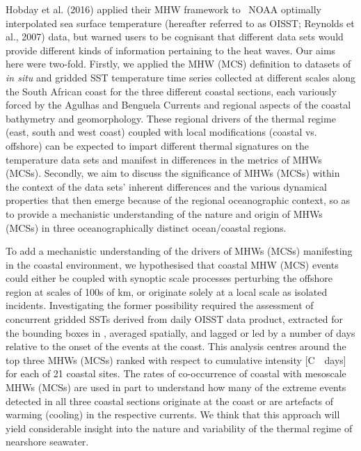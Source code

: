 \documentclass[a4paper,10pt,review]{elsarticle}
\begin{document}
Hobday et al. (2016) applied their MHW framework to \degree~NOAA optimally interpolated sea surface temperature (hereafter referred to as OISST; Reynolds et al., 2007) data, but warned users to be cognisant that different data sets would provide different kinds of information pertaining to the heat waves. Our aims here were two-fold. Firstly, we applied the MHW (MCS) definition to datasets of \emph{in situ} and gridded SST temperature time series collected at different scales along the South African coast for the three different coastal sections, each variously forced by the Agulhas and Benguela Currents and regional aspects of the coastal bathymetry and geomorphology. These regional drivers of the thermal regime (east, south and west coast) coupled with local modifications (coastal vs. offshore) can be expected to impart different thermal signatures on the temperature data sets and manifest in differences in the metrics of MHWs (MCSs). Secondly, we aim to discuss the significance of MHWs (MCSs) within the context of the data sets’ inherent differences and the various dynamical properties that then emerge because of the regional oceanographic context, so as to provide a mechanistic understanding of the nature and origin of MHWs (MCSs) in three oceanographically distinct ocean/coastal regions.

To add a mechanistic understanding of the drivers of MHWs (MCSs) manifesting in the coastal environment, we hypothesised that coastal MHW (MCS) events could either be coupled with synoptic scale processes perturbing the offshore region at scales of 100s of km, or originate solely at a local scale as isolated incidents. Investigating the former possibility required the assessment of concurrent gridded SSTs derived from daily OISST data product, extracted for the bounding boxes in , averaged spatially, and lagged or led by a number of days relative to the onset of the events at the coast. This analysis centres around the top three MHWs (MCSs) ranked with respect to cumulative intensity [\degree C~\texttimes~days] for each of 21 coastal sites. The rates of co-occurrence of coastal with mesoscale MHWs (MCSs) are used in part to understand how many of the extreme events detected in all three coastal sections originate at the coast or are artefacts of warming (cooling) in the respective currents. We think that this approach will yield considerable insight into the nature and variability of the thermal regime of nearshore seawater.
\end{document}
